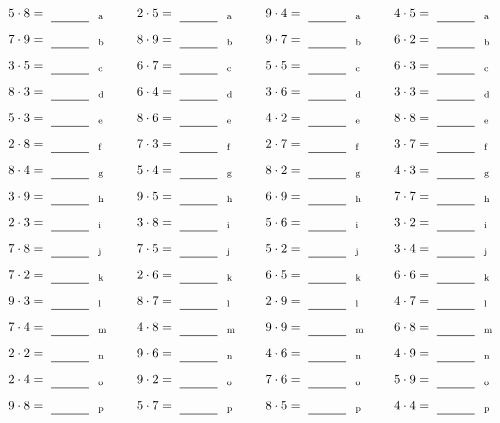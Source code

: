\documentclass
[
  draft    = true,
  fontsize = 11pt,
  parskip  = half-
]
{scrartcl}
\begin{document}
\par\vfill\par
\begin{align*}
    \pline{5\cdot8}&=\rline{a}
  & \pline{2\cdot5}&=\rline{a}
  & \pline{9\cdot4}&=\rline{a}
  & \pline{4\cdot5}&=\rline{a} \\[1ex]
    \pline{7\cdot9}&=\rline{b}
  & \pline{8\cdot9}&=\rline{b}
  & \pline{9\cdot7}&=\rline{b}
  & \pline{6\cdot2}&=\rline{b} \\[1ex]
    \pline{3\cdot5}&=\rline{c}
  & \pline{6\cdot7}&=\rline{c}
  & \pline{5\cdot5}&=\rline{c}
  & \pline{6\cdot3}&=\rline{c} \\[1ex]
    \pline{8\cdot3}&=\rline{d}
  & \pline{6\cdot4}&=\rline{d}
  & \pline{3\cdot6}&=\rline{d}
  & \pline{3\cdot3}&=\rline{d} \\[1ex]
    \pline{5\cdot3}&=\rline{e}
  & \pline{8\cdot6}&=\rline{e}
  & \pline{4\cdot2}&=\rline{e}
  & \pline{8\cdot8}&=\rline{e} \\[1ex]
    \pline{2\cdot8}&=\rline{f}
  & \pline{7\cdot3}&=\rline{f}
  & \pline{2\cdot7}&=\rline{f}
  & \pline{3\cdot7}&=\rline{f} \\[1ex]
    \pline{8\cdot4}&=\rline{g}
  & \pline{5\cdot4}&=\rline{g}
  & \pline{8\cdot2}&=\rline{g}
  & \pline{4\cdot3}&=\rline{g} \\[1ex]
    \pline{3\cdot9}&=\rline{h}
  & \pline{9\cdot5}&=\rline{h}
  & \pline{6\cdot9}&=\rline{h}
  & \pline{7\cdot7}&=\rline{h} \\[1ex]
    \pline{2\cdot3}&=\rline{i}
  & \pline{3\cdot8}&=\rline{i}
  & \pline{5\cdot6}&=\rline{i}
  & \pline{3\cdot2}&=\rline{i} \\[1ex]
    \pline{7\cdot8}&=\rline{j}
  & \pline{7\cdot5}&=\rline{j}
  & \pline{5\cdot2}&=\rline{j}
  & \pline{3\cdot4}&=\rline{j} \\[1ex]
    \pline{7\cdot2}&=\rline{k}
  & \pline{2\cdot6}&=\rline{k}
  & \pline{6\cdot5}&=\rline{k}
  & \pline{6\cdot6}&=\rline{k} \\[1ex]
    \pline{9\cdot3}&=\rline{l}
  & \pline{8\cdot7}&=\rline{l}
  & \pline{2\cdot9}&=\rline{l}
  & \pline{4\cdot7}&=\rline{l} \\[1ex]
    \pline{7\cdot4}&=\rline{m}
  & \pline{4\cdot8}&=\rline{m}
  & \pline{9\cdot9}&=\rline{m}
  & \pline{6\cdot8}&=\rline{m} \\[1ex]
    \pline{2\cdot2}&=\rline{n}
  & \pline{9\cdot6}&=\rline{n}
  & \pline{4\cdot6}&=\rline{n}
  & \pline{4\cdot9}&=\rline{n} \\[1ex]
    \pline{2\cdot4}&=\rline{o}
  & \pline{9\cdot2}&=\rline{o}
  & \pline{7\cdot6}&=\rline{o}
  & \pline{5\cdot9}&=\rline{o} \\[1ex]
    \pline{9\cdot8}&=\rline{p}
  & \pline{5\cdot7}&=\rline{p}
  & \pline{8\cdot5}&=\rline{p}
  & \pline{4\cdot4}&=\rline{p}
\end{align*}
\end{document}
